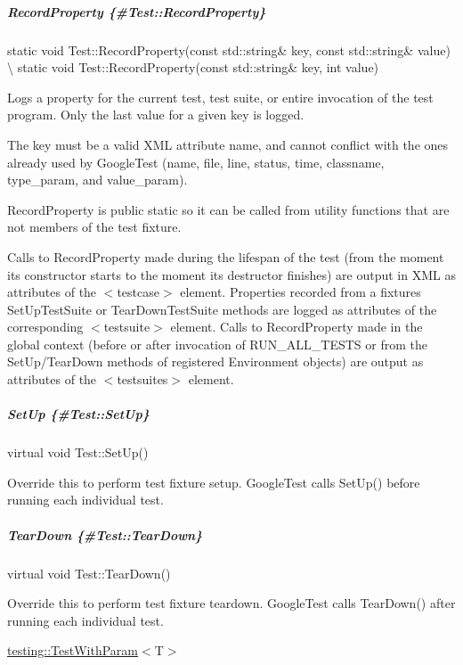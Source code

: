 \subparagraph*{Record\+Property \{\#\+Test\+::\+Record\+Property\}}

{\ttfamily static void Test\+::\+Record\+Property(const std\+::string\& key, const std\+::string\& value)} \textbackslash{} {\ttfamily static void Test\+::\+Record\+Property(const std\+::string\& key, int value)}

Logs a property for the current test, test suite, or entire invocation of the test program. Only the last value for a given key is logged.

The key must be a valid X\+ML attribute name, and cannot conflict with the ones already used by Google\+Test ({\ttfamily name}, {\ttfamily file}, {\ttfamily line}, {\ttfamily status}, {\ttfamily time}, {\ttfamily classname}, {\ttfamily type\+\_\+param}, and {\ttfamily value\+\_\+param}).

{\ttfamily Record\+Property} is {\ttfamily public static} so it can be called from utility functions that are not members of the test fixture.

Calls to {\ttfamily Record\+Property} made during the lifespan of the test (from the moment its constructor starts to the moment its destructor finishes) are output in X\+ML as attributes of the {\ttfamily $<$testcase$>$} element. Properties recorded from a fixture\textquotesingle{}s {\ttfamily Set\+Up\+Test\+Suite} or {\ttfamily Tear\+Down\+Test\+Suite} methods are logged as attributes of the corresponding {\ttfamily $<$testsuite$>$} element. Calls to {\ttfamily Record\+Property} made in the global context (before or after invocation of {\ttfamily R\+U\+N\+\_\+\+A\+L\+L\+\_\+\+T\+E\+S\+TS} or from the {\ttfamily Set\+Up}/{\ttfamily Tear\+Down} methods of registered {\ttfamily Environment} objects) are output as attributes of the {\ttfamily $<$testsuites$>$} element.

\subparagraph*{Set\+Up \{\#\+Test\+::\+Set\+Up\}}

{\ttfamily virtual void Test\+::\+Set\+Up()}

Override this to perform test fixture setup. Google\+Test calls {\ttfamily Set\+Up()} before running each individual test.

\subparagraph*{Tear\+Down \{\#\+Test\+::\+Tear\+Down\}}

{\ttfamily virtual void Test\+::\+Tear\+Down()}

Override this to perform test fixture teardown. Google\+Test calls {\ttfamily Tear\+Down()} after running each individual test.

{\ttfamily \mbox{\hyperlink{classtesting_1_1TestWithParam}{testing\+::\+Test\+With\+Param}}$<$T$>$}


